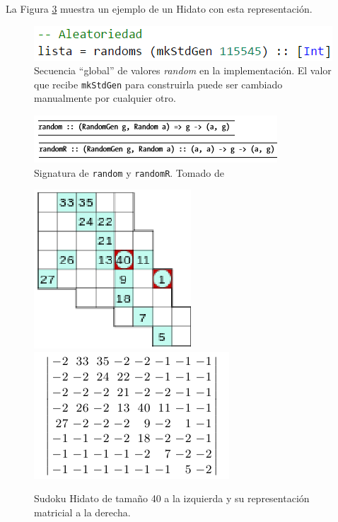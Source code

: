 \documentclass{llncs}
\begin{document}
La Figura \ref{hidato} muestra un ejemplo de un Hidato con esta representaci\'on.

\begin{figure}
\begin{center}
\includegraphics[width= .8\columnwidth]{figuras/lista}
\end{center}
\caption{Secuencia ``global'' de valores \emph{random} en la implementaci\'on. El valor que recibe \texttt{mkStdGen} para construirla puede ser cambiado manualmente por  cualquier otro.}
\label{listar}
\end{figure}

\begin{figure}
\begin{center}
\includegraphics[width= .7\columnwidth]{figuras/rand}
\end{center}
\caption{Signatura de \texttt{random} y \texttt{randomR}. Tomado de \cite[p.191, p.194]{baeza}}
\label{rand}
\end{figure}

\begin{figure}
\begin{center}
\includegraphics[width= 0.3\columnwidth]{figuras/sudoku}
\includegraphics[width= 0.48\columnwidth]{figuras/matrep}
\end{center}
\caption{Sudoku Hidato de tama\~no 40 a la izquierda y su representaci\'on matricial a la derecha.}
\label{hidato}
\end{figure}
\end{document}
